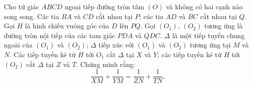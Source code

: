 \begin{bt}%
Cho tứ giác $ABCD$ ngoại tiếp đường tròn tâm $(O)$ và không có hai cạnh nào song song. Các tia $BA$ và $CD$ cắt nhau tại $P$; các tia $AD$ và $BC$ cắt nhau tại $Q$. Gọi $H$ là hình chiếu vuông góc của $D$ lên $PQ$. Gọi $(O_1)$, $(O_2)$ tương ứng là đường tròn nội tiếp của các tam giác $PDA$ và $QDC$. $\Delta$ là một tiếp tuyến chung ngoài của $(O_1)$ và $(O_2)$; $\Delta$ tiếp xúc với $(O_1)$ và $(O_2)$ tương ứng tại $M$ và $N$. Các tiếp tuyến kẻ từ $H$ tới $O_1$ cắt $\Delta$ tại $X$ và $Y$; các tiếp tuyến kẻ từ $H$ tới $(O_2)$ cắt $\Delta$ tại $Z$ và $T$. Chứng minh rằng:
$$\dfrac{1}{XM}+\dfrac{1}{YM}=\dfrac{1}{ZN}+\dfrac{1}{TN}.$$
\loigiai
{
\begin{center}
\end{center}}
\end{bt}
